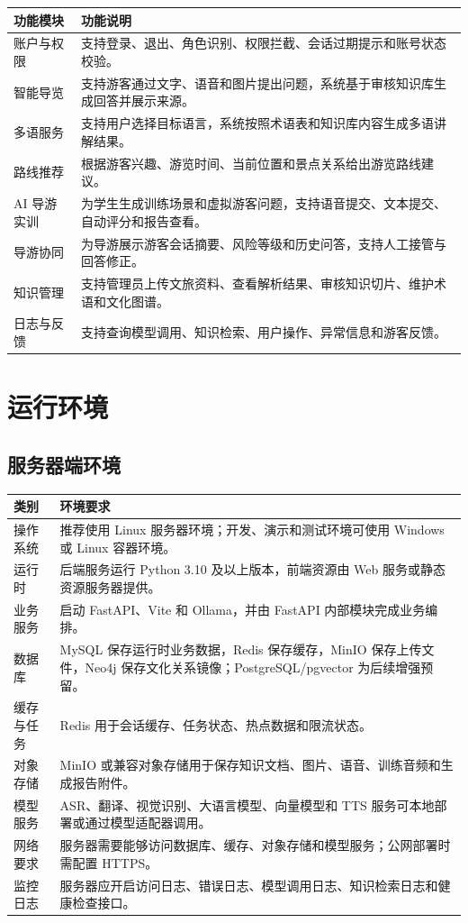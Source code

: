 \begin{longtable}{p{3.0cm}p{10.4cm}}
\toprule
功能模块 & 功能说明 \\
\midrule
账户与权限 & 支持登录、退出、角色识别、权限拦截、会话过期提示和账号状态校验。 \\
智能导览 & 支持游客通过文字、语音和图片提出问题，系统基于审核知识库生成回答并展示来源。 \\
多语服务 & 支持用户选择目标语言，系统按照术语表和知识库内容生成多语讲解结果。 \\
路线推荐 & 根据游客兴趣、游览时间、当前位置和景点关系给出游览路线建议。 \\
AI 导游实训 & 为学生生成训练场景和虚拟游客问题，支持语音提交、文本提交、自动评分和报告查看。 \\
导游协同 & 为导游展示游客会话摘要、风险等级和历史问答，支持人工接管与回答修正。 \\
知识管理 & 支持管理员上传文旅资料、查看解析结果、审核知识切片、维护术语和文化图谱。 \\
日志与反馈 & 支持查询模型调用、知识检索、用户操作、异常信息和游客反馈。 \\
\bottomrule
\end{longtable}

\section{运行环境}

\subsection{服务器端环境}

\begin{longtable}{p{3.0cm}p{10.4cm}}
\toprule
类别 & 环境要求 \\
\midrule
操作系统 & 推荐使用 Linux 服务器环境；开发、演示和测试环境可使用 Windows 或 Linux 容器环境。 \\
运行时 & 后端服务运行 Python 3.10 及以上版本，前端资源由 Web 服务或静态资源服务器提供。 \\
业务服务 & 启动 FastAPI、Vite 和 Ollama，并由 FastAPI 内部模块完成业务编排。 \\
数据库 & MySQL 保存运行时业务数据，Redis 保存缓存，MinIO 保存上传文件，Neo4j 保存文化关系镜像；PostgreSQL/pgvector 为后续增强预留。 \\
缓存与任务 & Redis 用于会话缓存、任务状态、热点数据和限流状态。 \\
对象存储 & MinIO 或兼容对象存储用于保存知识文档、图片、语音、训练音频和生成报告附件。 \\
模型服务 & ASR、翻译、视觉识别、大语言模型、向量模型和 TTS 服务可本地部署或通过模型适配器调用。 \\
网络要求 & 服务器需要能够访问数据库、缓存、对象存储和模型服务；公网部署时需配置 HTTPS。 \\
监控日志 & 服务器应开启访问日志、错误日志、模型调用日志、知识检索日志和健康检查接口。 \\
\bottomrule
\end{longtable}

